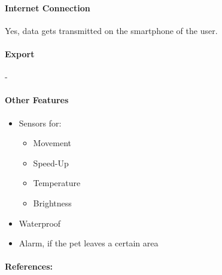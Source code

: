 \paragraph{Internet Connection}Yes, data gets transmitted on the smartphone of the user.
\paragraph{Export}-
\paragraph{Other Features}
\begin{itemize}
\item Sensors for:
\begin{itemize}
\item Movement
\item Speed-Up
\item Temperature
\item Brightness
\end{itemize}
\item Waterproof
\item Alarm, if the pet leaves a certain area
\end{itemize}
\paragraph{References:}\cite{Tractive}
\newpage


